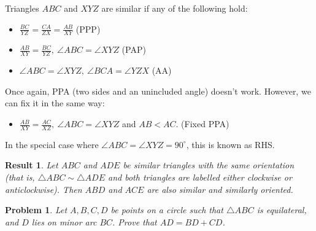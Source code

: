 \documentclass{amsart}
\newtheorem{problem}{Problem}[subsubsection]
\newtheorem{result}{Result}[subsubsection]
\begin{document}
    Triangles $ABC$ and $XYZ$ are similar if any of the following hold:
  \begin{itemize}
    \item $\frac{BC}{YZ}=\frac{CA}{ZX}=\frac{AB}{XY}$ (PPP)
    \item $\frac{AB}{XY}=\frac{BC}{YZ},\ \angle ABC=\angle XYZ$ (PAP)
    \item $\angle ABC=\angle XYZ,\ \angle BCA=\angle YZX$ (AA)
  \end{itemize}
  Once again, PPA (two sides and an unincluded angle) doesn't work. However, we
  can fix it in the same way:
  \begin{itemize}
    \item $\frac{AB}{XY}=\frac{AC}{XZ},\ \angle ABC=\angle XYZ$ and $AB<AC$.
      (Fixed PPA)
  \end{itemize}
  In the special case where $\angle ABC=\angle XYZ=90^\circ$, this is
  known as RHS\@.
\begin{result}{\label{r:b:g:s:1}}
  Let $ABC$ and $ADE$ be similar triangles with the same orientation (that is,
  $\triangle ABC\sim\triangle ADE$ and both triangles are labelled either
  clockwise or anticlockwise). Then $ABD$ and $ACE$ are also similar and
  similarly oriented.
\end{result}
\begin{problem}{\label{p:b:g:s:1}}
  Let $A,B,C,D$ be points on a circle such that $\triangle ABC$ is equilateral,
  and $D$ lies on minor arc $BC$. Prove that $AD=BD+CD$.
\end{problem}
\end{document}

